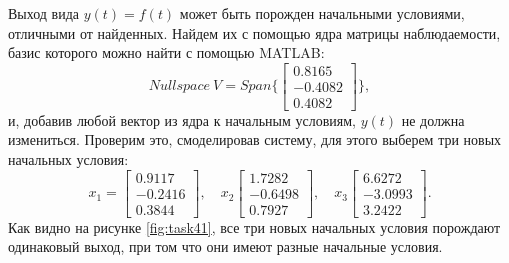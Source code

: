 Выход вида $y(t) = f (t)$ может быть порожден начальными условиями, 
отличными от найденных. Найдем их с помощью ядра матрицы наблюдаемости,
базис которого можно найти с помощью MATLAB:
\begin{equation*}
    Nullspace\ V=Span\Big\{\begin{bmatrix}
        0.8165 \\ -0.4082 \\ 0.4082
    \end{bmatrix}\Big\},
\end{equation*}
и, добавив любой вектор из ядра к начальным условиям, $y(t)$
не должна измениться. Проверим это, смоделировав систему, для
этого выберем три новых начальных условия:
\begin{equation*}
    x_1=\begin{bmatrix}
        0.9117\\
   -0.2416\\
    0.3844
    \end{bmatrix},\quad
    x_2\begin{bmatrix}
        1.7282\\
        -0.6498\\
         0.7927
    \end{bmatrix},\quad
    x_3\begin{bmatrix}
        6.6272\\
        -3.0993\\
         3.2422
    \end{bmatrix}.
\end{equation*}
Как видно на рисунке \ref{fig:task41}, все три новых начальных условия
порождают одинаковый выход, при том что они имеют разные начальные условия.

